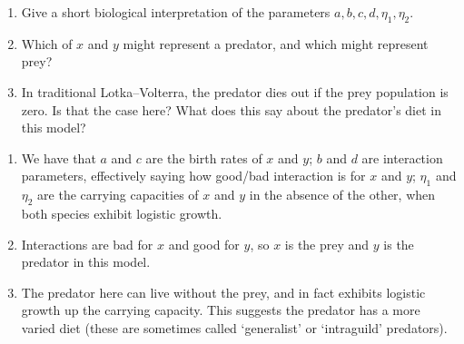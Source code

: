 \documentclass[a4paper,12pt]{article}
\begin{document}
\begin{enumerate}
	\question{}
	{ %
	\begin{enumerate}
		\item Give a short biological interpretation of the parameters $a,b,c,d,\eta_1,\eta_2$. 
		\item Which of $x$ and $y$ might represent a predator, and which might represent prey? 
		\item In traditional Lotka--Volterra, the predator dies out if the prey population is zero. Is that the case here? What does this say about the predator's diet in this model?
	\end{enumerate}
	}
	{ %
	\begin{enumerate}
		\item We have that $a$ and $c$ are the birth rates of $x$ and $y$; $b$ and $d$ are interaction parameters, effectively saying how good/bad interaction is for $x$ and $y$; $\eta_1$ and $\eta_2$ are the carrying capacities of $x$ and $y$ in the absence of the other, when both species exhibit logistic growth.
		\item Interactions are bad for $x$ and good for $y$, so $x$ is the prey and $y$ is the predator in this model.
		\item The predator here can live without the prey, and in fact exhibits logistic growth up the carrying capacity. This suggests the predator has a more varied diet (these are sometimes called `generalist' or `intraguild' predators).
	\end{enumerate}
	}
	

\end{enumerate}
\end{document}
